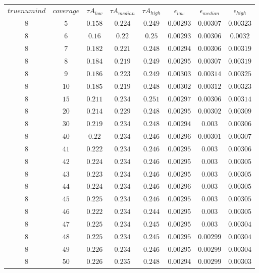 \begin{table}[H]
\begin{tabular}{cccccccc}
$truenumind$ & $coverage$ & ${\tau}A_{low}$ & ${\tau}A_{median}$ & ${\tau}A_{high}$ & $\epsilon_{low}$ & $\epsilon_{median}$ & $\epsilon_{high}$\\
$8$ & $5$ & $0.158$ & $0.224$ & $0.249$ & $0.00293$ & $0.00307$ & $0.00323$\\
$8$ & $6$ & $0.16$ & $0.22$ & $0.25$ & $0.00293$ & $0.00306$ & $0.0032$\\
$8$ & $7$ & $0.182$ & $0.221$ & $0.248$ & $0.00294$ & $0.00306$ & $0.00319$\\
$8$ & $8$ & $0.184$ & $0.219$ & $0.249$ & $0.00295$ & $0.00307$ & $0.00319$\\
$8$ & $9$ & $0.186$ & $0.223$ & $0.249$ & $0.00303$ & $0.00314$ & $0.00325$\\
$8$ & $10$ & $0.185$ & $0.219$ & $0.248$ & $0.00302$ & $0.00312$ & $0.00323$\\
$8$ & $15$ & $0.211$ & $0.234$ & $0.251$ & $0.00297$ & $0.00306$ & $0.00314$\\
$8$ & $20$ & $0.214$ & $0.229$ & $0.248$ & $0.00295$ & $0.00302$ & $0.00309$\\
$8$ & $30$ & $0.219$ & $0.234$ & $0.248$ & $0.00294$ & $0.003$ & $0.00306$\\
$8$ & $40$ & $0.22$ & $0.234$ & $0.246$ & $0.00296$ & $0.00301$ & $0.00307$\\
$8$ & $41$ & $0.222$ & $0.234$ & $0.246$ & $0.00295$ & $0.003$ & $0.00306$\\
$8$ & $42$ & $0.224$ & $0.234$ & $0.246$ & $0.00295$ & $0.003$ & $0.00305$\\
$8$ & $43$ & $0.223$ & $0.234$ & $0.246$ & $0.00295$ & $0.003$ & $0.00305$\\
$8$ & $44$ & $0.224$ & $0.234$ & $0.246$ & $0.00296$ & $0.003$ & $0.00305$\\
$8$ & $45$ & $0.225$ & $0.234$ & $0.246$ & $0.00295$ & $0.003$ & $0.00305$\\
$8$ & $46$ & $0.222$ & $0.234$ & $0.244$ & $0.00295$ & $0.003$ & $0.00305$\\
$8$ & $47$ & $0.225$ & $0.234$ & $0.245$ & $0.00295$ & $0.003$ & $0.00304$\\
$8$ & $48$ & $0.225$ & $0.234$ & $0.245$ & $0.00295$ & $0.00299$ & $0.00304$\\
$8$ & $49$ & $0.226$ & $0.234$ & $0.246$ & $0.00295$ & $0.00299$ & $0.00304$\\
$8$ & $50$ & $0.226$ & $0.235$ & $0.248$ & $0.00294$ & $0.00299$ & $0.00303$\\

\end{tabular}
\end{table}
